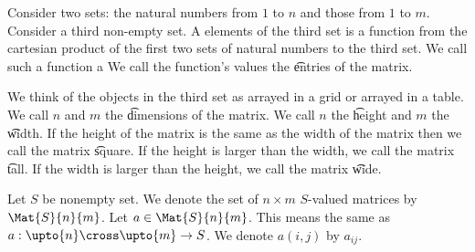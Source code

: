 


Consider two sets: the natural numbers from
$1$ to $n$ and those from $1$ to $m$.
Consider a third non-empty set.
A  elements of the third set is a function from the cartesian product of the first two sets of natural numbers to the third set.
We call such a function a 
We call the function's values the \t{entries} of the matrix.

We think of the objects in the third set as arrayed in a grid or arrayed in a table.
We call $n$ and $m$ the \t{dimensions} of the matrix.
We call $n$ the \t{height} and $m$ the \t{width}.
If the height of the matrix is the same as the width of the matrix then we call the matrix \t{square}.
If the height is larger than the width, we call the matrix \t{tall}.
If the width is larger than the height, we call the matrix \t{wide}.


Let $S$ be nonempty set.
We denote the set of $n \times m$ $S$-valued matrices by $\Mat{S}{n}{m}$.
Let $a \in \Mat{S}{n}{m}$.
This means the same as $a: \upto{n} \cross \upto{m} \to S$.
We denote $a(i, j)$ by $a_{ij}$.
